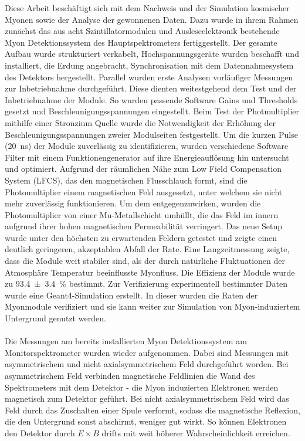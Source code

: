 Diese Arbeit besch\"aftigt sich mit dem Nachweis und der Simulation kosmischer Myonen sowie der Analyse der gewonnenen Daten.
Dazu wurde in ihrem Rahmen zun\"achst das aus acht Szintillatormodulen und Ausleseelektronik bestehende Myon Detektionssystem des Hauptspektrometers fertiggestellt. Der gesamte Aufbau wurde strukturiert verkabelt, Hochspannungsger\"ate wurden beschafft und installiert, die Erdung angebracht, Synchronisation mit dem Datennahmesystem des Detektors hergestellt.
Parallel wurden erste Analysen vorl\"aufiger Messungen zur Inbetriebnahme durchgef\"uhrt. Diese dienten weitestgehend dem Test und der Inbetriebnahme der Module. So wurden passende Software Gains und Thresholds gesetzt und Beschleunigungsspannungen eingestellt. Beim Test der Photmultiplier mithilfe einer Stronzium Quelle wurde die Notwendigkeit der Erh\"ohung der Beschleunigungsspannungen zweier Modulseiten festgestellt. Um die kurzen Pulse (\SI{20}{\nano\second}) der Module zuverl\"assig zu identifizieren, wurden verschiedene Software Filter mit einem Funktionengenerator auf ihre Energieaufl\"osung hin untersucht und optimiert.
Aufgrund der r\"aumlichen N\"ahe zum Low Field Compensation System (LFCS), das den magnetischen Flusschlauch formt, sind die Photomultiplier einem magnetischen Feld ausgesetzt, unter welchem sie nicht mehr zuverl\"assig funktionieren. Um dem entgegenzuwirken, wurden die Photomultiplier von einer Mu-Metallschicht umh\"ullt, die das Feld im innern aufgrund ihrer hohen magnetischen Permeabilit\"at verringert. Das neue Setup wurde unter den h\"ochsten zu erwartenden Feldern getestet und zeigte einen deutlich geringeren, akzeptablen Abfall der Rate.
Eine Langzeitmessung zeigte, dass die Module weit stabiler sind, als der durch nat\"urliche Fluktuationen der Atmosph\"are Temperatur beeinflusste Myonfluss. Die Effizienz der Module wurde zu \SI{93.4 \pm 3.4}{\percent} bestimmt.
Zur Verifizierung experimentell bestimmter Daten wurde eine Geant4-Simulation erstellt. In dieser wurden die Raten der Myonmodule verifiziert und sie kann weiter zur Simulation von Myon-induziertem Untergrund genutzt werden.\\\\
Die Messungen am bereits installierten Myon Detektionssystem am Monitorspektrometer wurden wieder aufgenommen. Dabei sind Messungen mit asymmetrischem und nicht axialsymmetrischem Feld durchgef\"uhrt worden. Bei asymmetrischem Feld verbinden magnetische Feldlinien die Wand des Spektrometers mit dem Detektor - die Myon induzierten Elektronen werden magnetisch zum Detektor gef\"uhrt. Bei nicht axialsymmetrischem Feld wird das Feld durch das Zuschalten einer Spule verformt, sodass die magnetische Reflexion, die den Untergrund sonst abschirmt, weniger gut wirkt. So k\"onnen Elektronen den Detektor durch $E\times B$ drifts mit weit h\"oherer Wahrscheinlichkeit erreichen. 
